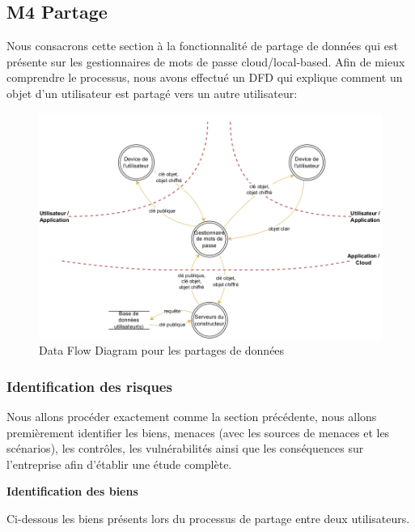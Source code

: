 \subsection{M4 Partage}

Nous consacrons cette section à la fonctionnalité de partage de données qui est présente sur les gestionnaires de mots de passe cloud/local-based. Afin de mieux comprendre le processus, nous avons effectué un DFD qui explique comment un objet d'un utilisateur est partagé vers un autre utilisateur:

\begin{figure}[H]
	\includegraphics[width=14.5cm]{images/dfd_share.png}
	\centering
	\caption{Data Flow Diagram pour les partages de données}
\end{figure}

\subsubsection{Identification des risques}

Nous allons procéder exactement comme la section précédente, nous allons premièrement identifier les biens, menaces (avec les sources de menaces et les scénarios), les contrôles, les vulnérabilités ainsi que les conséquences sur l'entreprise afin d'établir une étude complète.

\textbf{Identification des biens}

Ci-dessous les biens présents lors du processus de partage entre deux utilisateurs.

\begin{table}[H]
	\centering
	\caption{Biens des gestionnaires de mots de passe M4}
\end{table}

